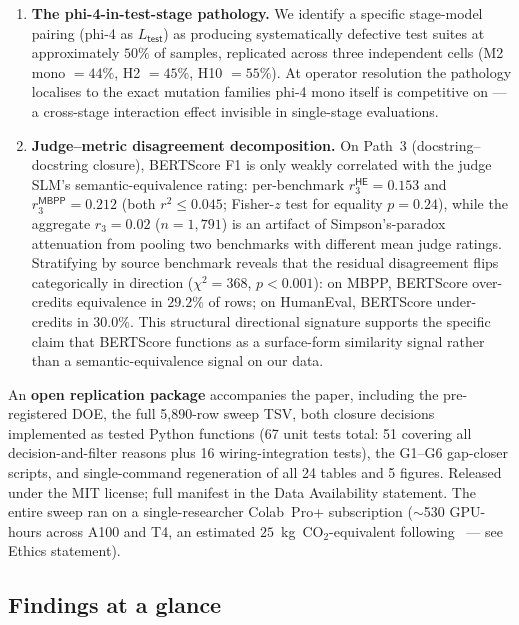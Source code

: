 \begin{enumerate}
  \item \textbf{The phi-4-in-test-stage pathology.} We identify a specific stage-model pairing (phi-4 as $L_{\textsf{test}}$) as producing systematically defective test suites at approximately $50\%$ of samples, replicated across three independent cells (M2 mono $= 44\%$, H2 $= 45\%$, H10 $= 55\%$). At operator resolution the pathology localises to the exact mutation families phi-4 mono itself is competitive on --- a cross-stage interaction effect invisible in single-stage evaluations.

  \item \textbf{Judge--metric disagreement decomposition.} On Path~3 (docstring--docstring closure), BERTScore F1 is only weakly correlated with the judge SLM's semantic-equivalence rating: per-benchmark $r_3^{\textsf{HE}} = 0.153$ and $r_3^{\textsf{MBPP}} = 0.212$ (both $r^2 \leq 0.045$; Fisher-$z$ test for equality $p = 0.24$), while the aggregate $r_3 = 0.02$ ($n = 1{,}791$) is an artifact of Simpson's-paradox attenuation from pooling two benchmarks with different mean judge ratings. Stratifying by source benchmark reveals that the residual disagreement flips categorically in direction ($\chi^2 = 368$, $p < 0.001$): on MBPP, BERTScore over-credits equivalence in $29.2\%$ of rows; on HumanEval, BERTScore under-credits in $30.0\%$. This structural directional signature supports the specific claim that BERTScore functions as a surface-form similarity signal rather than a semantic-equivalence signal on our data.

\end{enumerate}

An \textbf{open replication package} accompanies the paper, including the pre-registered DOE, the full 5{,}890-row sweep TSV, both closure decisions implemented as tested Python functions (67 unit tests total: 51 covering all decision-and-filter reasons plus 16 wiring-integration tests), the G1--G6 gap-closer scripts, and single-command regeneration of all 24 tables and 5 figures. Released under the MIT license; full manifest in the Data Availability statement. The entire sweep ran on a single-researcher Colab~Pro+ subscription ($\sim$530 GPU-hours across A100 and T4, an estimated $25$~kg~CO$_2$-equivalent following~\citet{Lacoste2019MLCO2Emissions} --- see Ethics statement).

\subsection{Findings at a glance}

